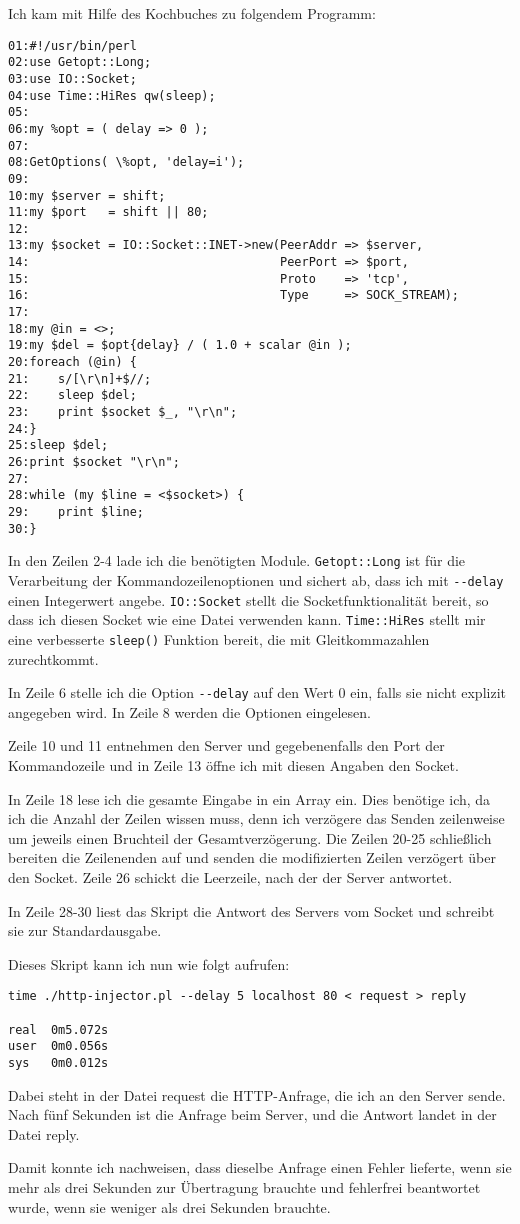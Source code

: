\begin{normaltext}
  Ich kam mit Hilfe des Kochbuches zu folgendem Programm:
  \begin{verbatim}
01:#!/usr/bin/perl
02:use Getopt::Long;
03:use IO::Socket;
04:use Time::HiRes qw(sleep);
05:
06:my %opt = ( delay => 0 );
07:
08:GetOptions( \%opt, 'delay=i');
09:
10:my $server = shift;
11:my $port   = shift || 80;
12:
13:my $socket = IO::Socket::INET->new(PeerAddr => $server,
14:                                   PeerPort => $port,
15:                                   Proto    => 'tcp',
16:                                   Type     => SOCK_STREAM);
17:
18:my @in = <>;
19:my $del = $opt{delay} / ( 1.0 + scalar @in );
20:foreach (@in) {
21:    s/[\r\n]+$//;
22:    sleep $del;
23:    print $socket $_, "\r\n";
24:}
25:sleep $del;
26:print $socket "\r\n";
27:
28:while (my $line = <$socket>) {
29:    print $line;
30:}
  \end{verbatim}
  In den Zeilen 2-4 lade ich die benötigten Module. \verb?Getopt::Long? ist
  für die Verarbeitung der Kommandozeilenoptionen und sichert ab, dass ich mit
  \verb?--delay? einen Integerwert angebe. \verb?IO::Socket? stellt die
  Socketfunktionalität bereit, so dass ich diesen Socket wie eine Datei
  verwenden kann. \verb?Time::HiRes? stellt mir eine verbesserte
  \verb?sleep()? Funktion bereit, die mit Gleitkommazahlen zurechtkommt.

  In Zeile 6 stelle ich die Option \verb?--delay? auf den Wert 0 ein, falls
  sie nicht explizit angegeben wird. In Zeile 8 werden die Optionen
  eingelesen.

  Zeile 10 und 11 entnehmen den Server und gegebenenfalls den Port der
  Kommandozeile und in Zeile 13 öffne ich mit diesen Angaben den Socket.

  In Zeile 18 lese ich die gesamte Eingabe in ein Array ein. Dies benötige
  ich, da ich die Anzahl der Zeilen wissen muss, denn ich verzögere das Senden
  zeilenweise um jeweils einen Bruchteil der Gesamtverzögerung. Die Zeilen
  20-25 schließlich bereiten die Zeilenenden auf und senden die modifizierten
  Zeilen verzögert über den Socket. Zeile 26 schickt die Leerzeile, nach der
  der Server antwortet.

  In Zeile 28-30 liest das Skript die Antwort des Servers vom Socket und
  schreibt sie zur Standardausgabe.

  Dieses Skript kann ich nun wie folgt aufrufen:
  \begin{verbatim}
time ./http-injector.pl --delay 5 localhost 80 < request > reply

real  0m5.072s
user  0m0.056s
sys   0m0.012s
  \end{verbatim}
  Dabei steht in der Datei request die HTTP-Anfrage, die ich an den Server
  sende.
  Nach fünf Sekunden ist die Anfrage beim Server, und die Antwort landet in
  der Datei reply.

  Damit konnte ich nachweisen, dass dieselbe Anfrage einen Fehler
  lieferte, wenn sie mehr als drei Sekunden zur Übertragung brauchte und
  fehlerfrei beantwortet wurde, wenn sie weniger als drei Sekunden brauchte.
\end{normaltext}

